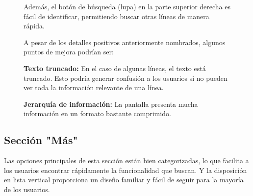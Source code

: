 \documentclass[a4paper,12pt]{article}
\begin{document}
\begin{figure}[htbp]
\begin{minipage}{0.3\textwidth}
        Además, el botón de búsqueda (lupa) en la parte superior derecha es fácil de identificar, permitiendo buscar otras líneas de manera rápida.
        
        A pesar de los detalles positivos anteriormente nombrados, algunos puntos de mejora podrían ser:

        \textbf{Texto truncado:} En el caso de algunas líneas, el texto está truncado. Esto podría generar confusión a los usuarios si no pueden ver toda la información relevante de una línea.
        
        \textbf{Jerarquía de información:} La pantalla presenta mucha información en un formato bastante comprimido.
    \end{minipage}
\end{figure}

\newpage

\subsection{Sección "Más"}
Las opciones principales de esta sección están bien categorizadas, lo que facilita a los usuarios encontrar rápidamente la funcionalidad que buscan. Y la disposición en lista vertical proporciona un diseño familiar y fácil de seguir para la mayoría de los usuarios.
\end{document}
